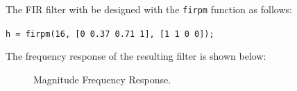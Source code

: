\documentclass[fleqn]{article}
\begin{document}
\begin{enumerate}
		\pagebreak
		The FIR filter with be designed with the \texttt{firpm} function as follows:
		
		\texttt{h = firpm(16, [0 0.37 0.71 1], [1 1 0 0]);}
		
		The frequency response of the resulting filter is shown below:
		
		\begin{figure}[H]
			\centerline{}
			\caption{Magnitude Frequency Response.}
		\end{figure}
	\end{enumerate}	
\end{document}

